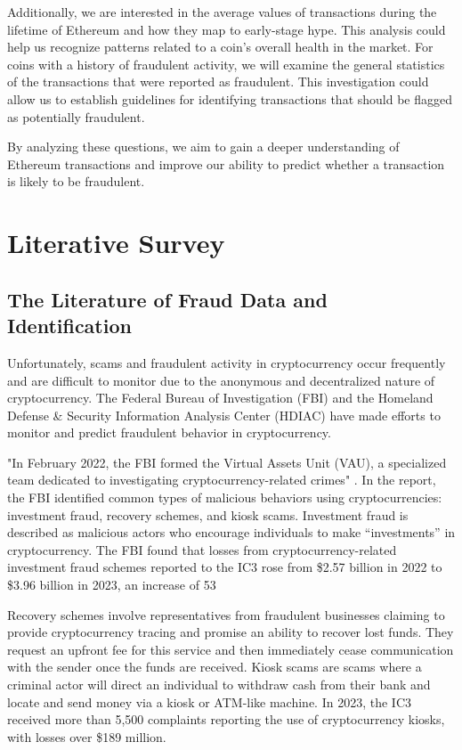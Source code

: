 \documentclass[sigconf]{acmart}
\begin{document}
Additionally, we are interested in the average values of transactions during the lifetime of Ethereum and how they map to early-stage hype. This analysis could help us recognize patterns related to a coin’s overall health in the market. For coins with a history of fraudulent activity, we will examine the general statistics of the transactions that were reported as fraudulent. This investigation could allow us to establish guidelines for identifying transactions that should be flagged as potentially fraudulent.

By analyzing these questions, we aim to gain a deeper understanding of Ethereum transactions and improve our ability to predict whether a transaction is likely to be fraudulent.

\section{Literative Survey}
\subsection{The Literature of Fraud Data and Identification}
Unfortunately, scams and fraudulent activity in cryptocurrency occur frequently and are difficult to monitor due to the anonymous and decentralized nature of cryptocurrency. The Federal Bureau of Investigation (FBI) and the Homeland Defense \& Security Information Analysis Center (HDIAC) have made efforts to monitor and predict fraudulent behavior in cryptocurrency.

"In February 2022, the FBI formed the Virtual Assets Unit (VAU), a specialized team dedicated to investigating cryptocurrency-related crimes" \cite{FBI2023}. In the report, the FBI identified common types of malicious behaviors using cryptocurrencies: investment fraud, recovery schemes, and kiosk scams. Investment fraud is described as malicious actors who encourage individuals to make “investments” in cryptocurrency. The FBI found that losses from cryptocurrency-related investment fraud schemes reported to the IC3 rose from \$2.57 billion in 2022 to \$3.96 billion in 2023, an increase of 53%

Recovery schemes involve representatives from fraudulent businesses claiming to provide cryptocurrency tracing and promise an ability to recover lost funds. They request an upfront fee for this service and then immediately cease communication with the sender once the funds are received. Kiosk scams are scams where a criminal actor will direct an individual to withdraw cash from their bank and locate and send money via a kiosk or ATM-like machine. In 2023, the IC3 received more than 5,500 complaints reporting the use of cryptocurrency kiosks, with losses over \$189 million.
\end{document}
